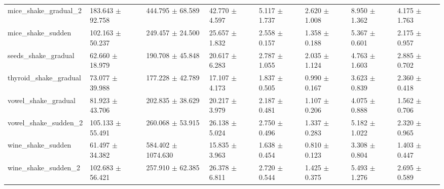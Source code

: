 \begin{tabular}{llllllll}
mice_shake_gradual_2 & 183.643 $\pm$ 92.758 & 444.795 $\pm$ 68.589 & 42.770 $\pm$ 4.597 & 5.117 $\pm$ 1.737 & 2.620 $\pm$ 1.008 & 8.950 $\pm$ 1.362 & 4.175 $\pm$ 1.763 \\
mice_shake_sudden & 102.163 $\pm$ 50.237 & 249.457 $\pm$ 24.500 & 25.657 $\pm$ 1.832 & 2.558 $\pm$ 0.157 & 1.358 $\pm$ 0.188 & 5.367 $\pm$ 0.601 & 2.175 $\pm$ 0.957 \\
seeds_shake_gradual & 62.660 $\pm$ 18.979 & 190.708 $\pm$ 45.848 & 20.617 $\pm$ 6.283 & 2.787 $\pm$ 1.055 & 2.035 $\pm$ 1.124 & 4.763 $\pm$ 1.603 & 2.885 $\pm$ 0.702 \\
thyroid_shake_gradual & 73.077 $\pm$ 39.988 & 177.228 $\pm$ 42.789 & 17.107 $\pm$ 4.173 & 1.837 $\pm$ 0.505 & 0.990 $\pm$ 0.167 & 3.623 $\pm$ 0.839 & 2.360 $\pm$ 0.418 \\
vowel_shake_gradual & 81.923 $\pm$ 43.706 & 202.835 $\pm$ 38.629 & 20.217 $\pm$ 3.979 & 2.187 $\pm$ 0.481 & 1.107 $\pm$ 0.206 & 4.075 $\pm$ 0.888 & 1.562 $\pm$ 0.706 \\
vowel_shake_sudden_2 & 105.133 $\pm$ 55.491 & 260.068 $\pm$ 53.915 & 26.138 $\pm$ 5.024 & 2.750 $\pm$ 0.496 & 1.337 $\pm$ 0.283 & 5.182 $\pm$ 1.022 & 2.320 $\pm$ 0.965 \\
wine_shake_sudden & 61.497 $\pm$ 34.382 & 584.402 $\pm$ 1074.630 & 15.835 $\pm$ 3.963 & 1.638 $\pm$ 0.454 & 0.810 $\pm$ 0.123 & 3.308 $\pm$ 0.804 & 1.403 $\pm$ 0.447 \\
wine_shake_sudden_2 & 102.683 $\pm$ 56.421 & 257.910 $\pm$ 62.385 & 26.378 $\pm$ 6.811 & 2.720 $\pm$ 0.544 & 1.425 $\pm$ 0.375 & 5.493 $\pm$ 1.276 & 2.695 $\pm$ 0.589 \\
\bottomrule
\end{tabular}
